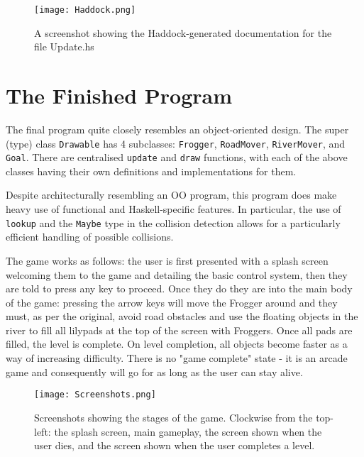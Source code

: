 \documentclass[12pt, a4paper]{report}
\begin{document}
\begin{figure}[ht]
  \centering
  \caption{A screenshot showing the Haddock-generated documentation for the file Update.hs}
  \texttt{[image: Haddock.png]}
  \label{fig:haddock}
\end{figure}


\section{The Finished Program}

The final program quite closely resembles an object-oriented design.
The super (type) class \verb|Drawable| has 4 subclasses: \verb|Frogger|, \verb|RoadMover|, \verb|RiverMover|, and \verb|Goal|.
There are centralised \verb|update| and \verb|draw| functions, with each of the above classes having their own definitions and implementations for them.

\par

Despite architecturally resembling an OO program, this program does make heavy use of functional and Haskell-specific features.
In particular, the use of \verb|lookup| and the \verb|Maybe| type in the collision detection allows for a particularly efficient handling of possible collisions.

\par

The game works as follows: the user is first presented with a splash screen welcoming them to the game and detailing the basic control system, then they are told to press any key to proceed.
Once they do they are into the main body of the game: pressing the arrow keys will move the Frogger around and they must, as per the original, avoid road obstacles and use the floating objects in the river to fill all lilypads at the top of the screen with Froggers.
Once all pads are filled, the level is complete.
On level completion, all objects become faster as a way of increasing difficulty.
There is no "game complete" state - it is an arcade game and consequently will go for as long as the user can stay alive.

\begin{figure}[ht]
  \centering
  \caption{Screenshots showing the stages of the game. Clockwise from the top-left: the splash screen, main gameplay, the screen shown when the user dies, and the screen shown when the user completes a level.}
  \texttt{[image: Screenshots.png]}
  \label{fig:screenshots}
\end{figure}
\end{document}
